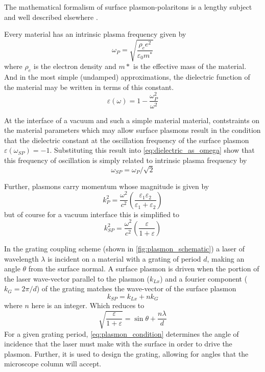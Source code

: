 The mathematical formalism of surface plasmon-polaritons is a lengthy subject and well described elsewhere \cite{cottam_introduction_2004,concepts_2002}.

Every material has an intrinsic plasma frequency given by 
\begin{equation}
  \omega_{P} = \sqrt{\frac{\rho_{e} e^2}{\varepsilon_{0} m^*}}
\end{equation}
where $\rho_{e}$ is the electron density and $m*$ is the effective mass of the material.
And in the most simple (undamped) approximations, the dielectric function of the material may be written in terms of this constant.
\begin{equation} \label{eq:dielectric_as_omega}
  \varepsilon(\omega) = 1 - \frac{ \omega_{P}^2 }{ \omega^2 }
\end{equation}

At the interface of a vacuum and such a simple material material, contstraints on the material parameters which may allow surface plasmons result in the condition that the dielectric constant at the oscillation frequency of the surface plasmon $ \varepsilon(\omega_{SP}) = -1 $.
Substituting this result into \ref{eq:dielectric_as_omega} show that this frequency of oscillation is simply related to intrinsic plasma frequency by
\begin{equation}
  \omega_{SP} = \omega_{P} / \sqrt{2}
\end{equation}

Further, plasmons carry momentum whose magnitude is given by
\begin{equation}
  k_{P}^2 = \frac{\omega^2}{c^2} \left( \frac{\varepsilon_{1} \varepsilon_{2}}{\varepsilon_{1} + \varepsilon_{2}} \right)
\end{equation}
but of course for a vacuum interface this is simplified to 
\begin{equation}
  k_{SP}^2 = \frac{\omega^2}{c^2} \left( \frac{ \varepsilon }{ 1 + \varepsilon } \right)
\end{equation}

In the grating coupling scheme (shown in \ref{fig:plasmon_schematic}) a laser of wavelength $\lambda$ is incident on a material with a grating of period $d$, making an angle $\theta$ from the surface normal. A surface plasmon is driven when the portion of the laser wave-vector parallel to the plasmon ($k_{Lx}$) and a fourier component ($k_{G} = 2 \pi / d$) of the grating matches the wave-vector of the surface plasmon
\begin{equation}
  k_{SP} = k_{Lx} + n k_{G}
\end{equation}
where $n$ here is an integer.
Which reduces to 
\begin{equation} \label{eq:plasmon_condition}
  \sqrt{ \frac{ \varepsilon }{ 1 + \varepsilon } } = \sin \theta + \frac{ n \lambda }{ d }
\end{equation}
For a given grating period, \ref{eq:plasmon_condition} determines the angle of incidence that the laser must make with the surface in order to drive the plasmon.
Further, it is used to design the grating, allowing for angles that the microscope column will accept.

